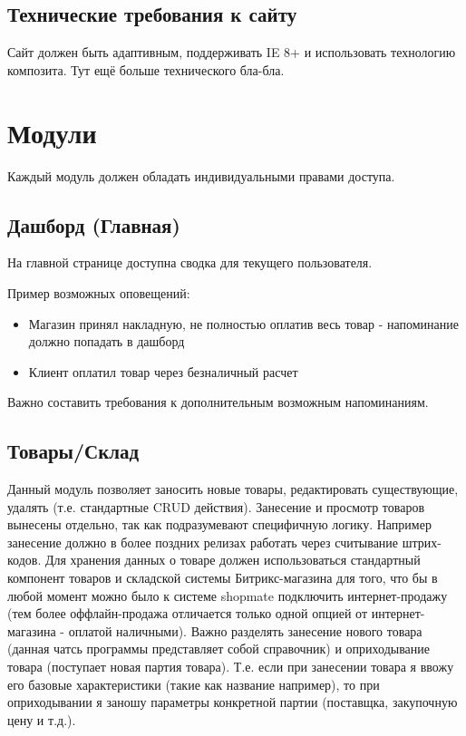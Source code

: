 \documentclass[DIV=calc, paper=a4, fontsize=11pt]{scrartcl} %
\begin{document}
\subsection{Технические требования к сайту}
Сайт должен быть адаптивным, поддерживать IE 8+ и использовать технологию композита.
Тут ещё больше технического бла-бла.


\section{Модули}

Каждый модуль должен обладать индивидуальными правами доступа.

\subsection{Дашборд (Главная)}
На главной странице доступна сводка для текущего пользователя. 

Пример возможных оповещений:

\begin{itemize}
	\item Магазин принял накладную, не полностью оплатив весь товар - напоминание должно попадать в дашборд
	\item Клиент оплатил товар через безналичный расчет 
\end{itemize}

Важно составить требования к дополнительным возможным напоминаниям.

\subsection{Товары/Склад}

Данный модуль позволяет заносить новые товары, редактировать существующие, удалять (т.е. стандартные CRUD действия). Занесение и просмотр товаров вынесены отдельно, так как подразумевают специфичную логику. Например занесение должно в более поздних релизах работать через считывание штрих-кодов. Для хранения данных о товаре должен использоваться стандартный компонент товаров и складской системы Битрикс-магазина для того, что бы в любой момент можно было к системе shopmate подключить интернет-продажу (тем более оффлайн-продажа отличается только одной опцией от интернет-магазина - оплатой наличными). Важно разделять занесение нового товара (данная чатсь программы представляет собой справочник) и оприходывание товара (поступает новая партия товара). Т.е. если при занесении товара я ввожу его базовые характеристики (такие как название например), то при оприходывании я заношу параметры конкретной партии (поставщка, закупочную цену и т.д.).
\end{document}
